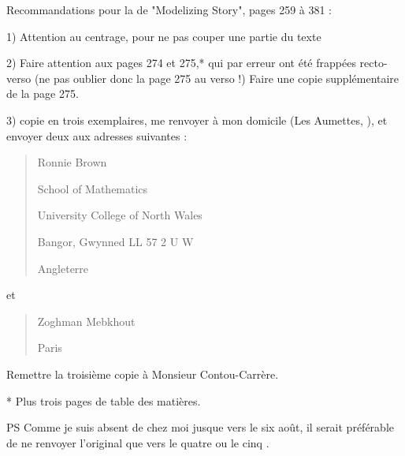 \documentclass[11pt,a4paper]{article}
\begin{document}

Recommandations pour la   de "Modelizing Story", pages 259 à
381 :

1) Attention  au centrage, pour ne pas couper une partie du texte

2) Faire attention aux pages 274 et 275,* qui par erreur ont été
frappées recto-verso (ne pas oublier donc la page 275 au verso !)
Faire une copie supplémentaire de la page 275.

3) \struck{\ill{}}  copie en trois exemplaires, me renvoyer \struck{\ill{}}  à mon domicile
(Les Aumettes, ), et envoyer  deux
\struck{\ill{}}  aux adresses suivantes :

\begin{quote}
Ronnie Brown

School of Mathematics

University College of North Wales

Bangor, Gwynned LL 57 2 U W

Angleterre
\end{quote}

et

\begin{quote}
Zoghman Mebkhout


Paris
\end{quote}

Remettre la troisième copie à Monsieur Contou-Carrère.



* Plus trois pages de table des matières.

PS Comme je suis absent de chez moi jusque vers le six août, il serait
préférable de ne renvoyer l'original que vers le quatre ou le cinq .
\end{document}
